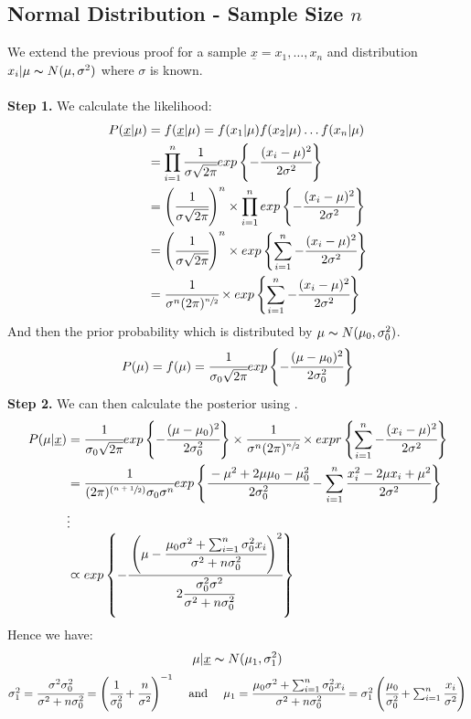 \subsection{Normal Distribution - Sample Size $n$}
We extend the previous proof for a sample $\underline{x} = x_1, \dots, x_n$ and distribution $x_i|\mu \thicksim N(\mu, \sigma^2)$ where $\sigma$ is known.
\\
\\ \textbf{Step 1.} We calculate the likelihood:
\[\begin{split}
		P(\underline{x}|\mu) &= f(\underline{x}|\mu) = f(x_1|\mu)f(x_2|\mu) \dots f(x_n|\mu)\\
		&= \prod_{i=1}^n \cfrac{1}{\sigma \sqrt{2 \pi}} exp\left\{ -\cfrac{(x_i - \mu)^2}{2\sigma^2}\right\} \\
		&= \left( \cfrac{1}{\sigma \sqrt{2 \pi}} \right)^n \times  \prod_{i=1}^n  exp\left\{ -\cfrac{(x_i - \mu)^2}{2\sigma^2}\right\} \\
		&= \left( \cfrac{1}{\sigma \sqrt{2 \pi}} \right)^n \times  exp\left\{ \sum_{i=1}^n -\cfrac{(x_i - \mu)^2}{2\sigma^2}\right\} \\
		&= \cfrac{1}{\sigma^n (2 \pi)^{\sfrac{n}{2}}} \times  exp\left\{ \sum_{i=1}^n -\cfrac{(x_i - \mu)^2}{2\sigma^2}\right\} \\
	\end{split}\]
And then the prior probability which is distributed by $\mu \thicksim N(\mu_0, \sigma^2_0)$.
\[P(\mu) = f(\mu) = \cfrac{1}{\sigma_0 \sqrt{2 \pi}} exp \left\{ -\cfrac{(\mu - \mu_0)^2}{2\sigma_0^2} \right\}\]
\textbf{Step 2.} We can then calculate the posterior using  .
\[\begin{split}
		P(\mu|\underline{x}) &= \cfrac{1}{\sigma_0 \sqrt{2 \pi}} exp \left\{ -\cfrac{(\mu - \mu_0)^2}{2\sigma_0^2} \right\} \times \cfrac{1}{\sigma^n (2 \pi)^{\sfrac{n}{2}}} \times  expr\left\{ \sum_{i=1}^n -\cfrac{(x_i - \mu)^2}{2\sigma^2}\right\} \\
		&= \cfrac{1}{(2 \pi)^{(\sfrac{n+1}{2})} \sigma_0 \sigma^n } exp \left\{ \cfrac{-\mu^2 + 2 \mu\mu_0 - \mu_0^2}{2\sigma^2_0} - \sum_{i=1}^n \cfrac{x_i^2 - 2\mu x_i + \mu^2}{2 \sigma^2} \right\} \\
		& \vdots \\
		& \varpropto exp \left\{ - \cfrac{\left(\mu - \cfrac{\mu_0 \sigma^2 + \sum_{i=1}^n \sigma_0^2x_i}{\sigma^2 + n \sigma^2_0}\right)^2}{2 \cfrac{\sigma_0^2\sigma^2}{\sigma^2 + n\sigma^2_0}} \right\}
	\end{split}\]
Hence we have:
\[\mu|\underline{x} \thicksim N(\mu_1, \sigma_1^2)\]
\[\begin{matrix}
		\sigma_1^2 = \cfrac{\sigma^2\sigma_0^2}{\sigma^2 + n \sigma_0^2} = \left( \cfrac{1}{\sigma_0^2} + \cfrac{n}{\sigma^2} \right)^{-1} & \text{  and  } & \mu_1 = \cfrac{\mu_0\sigma^2 + \sum_{i=1}^n\sigma^2_0x_i}{\sigma^2 + n\sigma_0^2} = \sigma_1^2\left( \cfrac{\mu_0}{\sigma_0^2} + \sum_{i=1}^n \cfrac{x_i}{\sigma^2} \right)
	\end{matrix}\]
